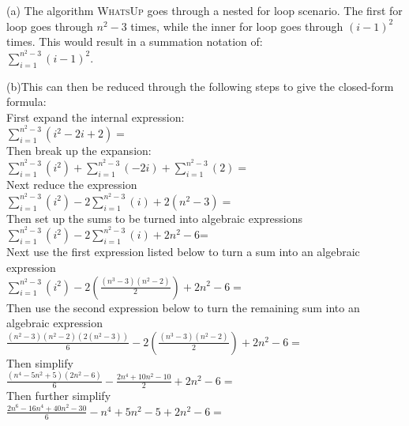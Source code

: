\documentclass{article}
\begin{document}
\Large
\begin{solution}
\begin{description}
\item{(a)} The algorithm \textsc{WhatsUp} goes through a nested for loop scenario. The first for loop goes through $n^2-3$ times, while the inner for loop goes through $(i-1)^2$ times. This would result in a summation notation of: \\$\sum_{i=1}^{n^2-3} {(i-1)^2}$.
\item{(b)}This can then be reduced through the following steps to give the closed-form formula:
\newline
\\First expand the internal expression:
\\$\sum_{i=1}^{n^2-3}(i^2-2i+2) =$ 
\newline
\\Then break up the expansion:
\\$\sum_{i=1}^{n^2-3}(i^2) + \sum_{i=1}^{n^2-3}(-2i) + \sum_{i=1}^{n^2-3}(2) =$
\newline
\\Next reduce the expression
\\$\sum_{i=1}^{n^2-3}(i^2) -2\sum_{i=1}^{n^2-3}(i) + 2(n^2 - 3) =$
\newline
\\Then set up the sums to be turned into algebraic expressions
\\$\sum_{i=1}^{n^2-3}(i^2) -2\sum_{i=1}^{n^2-3}(i) + 2n^2 - 6$=
\newline
\\Next use the first expression listed below to turn a sum into an algebraic expression
\\ $\sum_{i=1}^{n^2-3}(i^2) - 2(\frac{(n^3-3)(n^2-2)}{2}) + 2n^2 - 6 =$
\newline
\\Then use the second expression below to turn the remaining sum into an algebraic expression
\\$\frac{(n^2-3)(n^2-2)(2(n^2-3))}{6} - 2(\frac{(n^3-3)(n^2-2)}{2}) + 2n^2 - 6 =$
\newline
\\Then simplify
\\ $\frac{(n^4-5n^2+5)(2n^2-6)}{6} - \frac{2n^4+10n^2-10}{2} + 2n^2 - 6 =$
\newline
\\Then further simplify
\\ $\frac{2n^6-16n^4+40n^2-30}{6} - n^4+5n^2-5+2n^2-6 =$
\newline

\end{description}
\end{solution}
\end{document}
